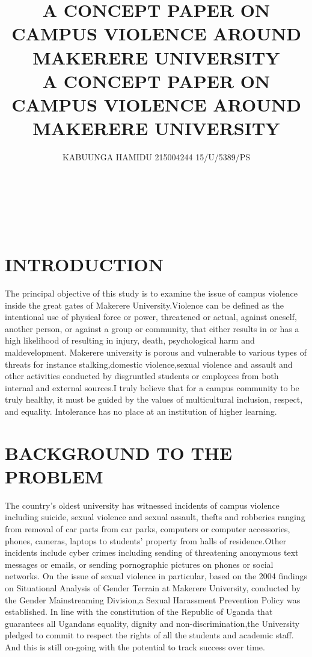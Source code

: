 \documentclass[10pt]{article}
\title{
	{A CONCEPT PAPER ON  CAMPUS VIOLENCE AROUND MAKERERE UNIVERSITY}\\
}
\author{
{KABUUNGA HAMIDU 215004244   15/U/5389/PS}
}
\begin{document}
\title{	{A CONCEPT PAPER ON  CAMPUS VIOLENCE AROUND MAKERERE UNIVERSITY}\\}
\maketitle

\

\

\section{INTRODUCTION}
{The principal objective of this study is to examine the issue of campus violence inside the great gates of Makerere 
	University.Violence can be defined as the intentional use of physical force or power, threatened or actual, against oneself, another person, or against a group or community, that either results in or has a high likelihood of resulting in injury, death, psychological harm and maldevelopment. Makerere university is porous and vulnerable to various types of threats for instance stalking,domestic violence,sexual violence and assault and other activities conducted by disgruntled students or employees from both internal and external sources.I truly believe that for a campus community to be truly healthy, it must be guided by the values of multicultural inclusion, respect, and equality. Intolerance has no place at an institution of higher learning.}
\section{BACKGROUND TO THE PROBLEM}
{The country's oldest university has witnessed incidents of campus violence including suicide, sexual violence and sexual assault, thefts and robberies ranging from removal of car parts from car parks, computers or computer accessories, phones, cameras, laptops to students’ property from halls of residence.Other incidents include cyber crimes including sending of threatening anonymous text messages or emails, or sending pornographic pictures on phones or social networks. On the issue of sexual violence in particular, based on the 2004 findings on Situational Analysis of Gender Terrain at Makerere University, conducted by the Gender Mainstreaming Division,a Sexual Harassment Prevention Policy was established. In line with the constitution of the Republic of Uganda that guarantees all Ugandans equality, dignity and non-discrimination,the University pledged to commit to respect the rights of all the students and academic staff. And this is still on-going with the potential to track success over time.
}
\end{document}

